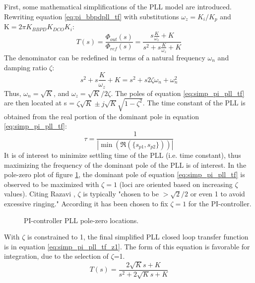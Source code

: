 			First, some mathematical simplifications of the PLL model are introduced. Rewriting equation \ref{eq:pi_bbpdpll_tf} with substitutions $\omega_z = K_i/K_p$ and $\mathrm{K} = 2\pi K_{BBPD}K_{DCO}K_{i}$:
			\begin{equation} \label{eq:simp_pi_pll_tf}
				T(s) = \frac{\Phi_{out}(s)}{\Phi_{ref}(s)} = \frac{s\frac{K}{\omega_z} + K }{s^2 + s\frac{K}{\omega_z} + K}
			\end{equation}
			The denominator can be redefined in terms of a natural frequency $\omega_n$ and damping ratio $\zeta$:
			\begin{equation}
				s^2 + s\frac{K}{\omega_z} + K = s^2 + s2\zeta\omega_n + \omega_n^2
			\end{equation}
			Thus, $\omega_n = \sqrt{K}$, and $\omega_z = \sqrt{K}/2\zeta$. The poles of equation \ref{eq:simp_pi_pll_tf} are then located at s = $\zeta\sqrt{K} \pm j\sqrt{K}\sqrt{1-\zeta^2}$. The time constant of the PLL is obtained from the real portion of the dominant pole in equation \ref{eq:simp_pi_pll_tf}:
			\begin{equation}
				\tau = \frac{1}{|\min(\Re(\{s_{p1}, s_{p2}\}))|}
			\end{equation}
			 It is of interest to minimize settling time of the PLL (i.e. time constant), thus maximizing the frequency of the dominant pole of the PLL is of interest. In the pole-zero plot of figure \ref{fig:pi_pll_pz}, the dominant pole of equation \ref{eq:simp_pi_pll_tf} is observed to be maximized with $\zeta=1$ (loci are oriented based on increasing $\zeta$ values). Citing Razavi \cite{razavi_2017}, $\zeta$ is typically 
			"chosen to be $>\sqrt{2}/2$ or even 1 to avoid excessive ringing." According it has been chosen to fix $\zeta=1$ for the PI-controller. 
			\begin{figure}[htb!]
				\center
				\caption{PI-controller PLL pole-zero locations.}
				\label{fig:pi_pll_pz}
			\end{figure}
			\FloatBarrier
			With $\zeta$ is constrained to 1, the final simplified PLL closed loop transfer function is in equation \ref{eq:simp_pi_pll_tf_z1}. The form of this equation is favorable for integration, due to the selection of $\zeta$=1.
			\begin{equation} \label{eq:simp_pi_pll_tf_z1}
				T(s) = \frac{2\sqrt{K}s + K }{s^2 + 2\sqrt{K}s + K}
			\end{equation}
			
